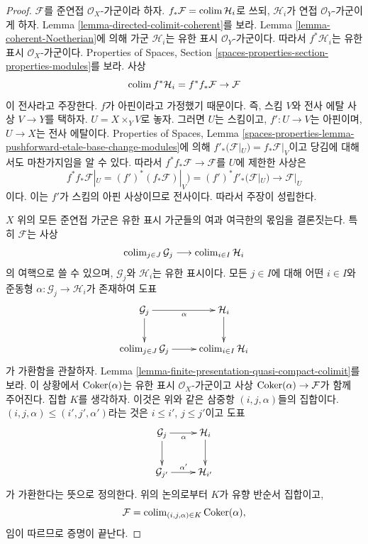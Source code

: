 \begin{proof}
$\mathcal{F}$를 준연접 $\mathcal{O}_X$-가군이라 하자.
$f_*\mathcal{F} = \mathop{\mathrm{colim}}\nolimits \mathcal{H}_i$로 쓰되, $\mathcal{H}_i$가 연접
$\mathcal{O}_Y$-가군이게 하자. Lemma
\ref{lemma-directed-colimit-coherent}를 보라. Lemma
\ref{lemma-coherent-Noetherian}에 의해 가군 $\mathcal{H}_i$는 유한 표시
$\mathcal{O}_Y$-가군이다. 따라서 $f^*\mathcal{H}_i$는 유한 표시
$\mathcal{O}_X$-가군이다. Properties of Spaces, Section
\ref{spaces-properties-section-properties-modules}를 보라. 사상
$$
\mathop{\mathrm{colim}}\nolimits f^*\mathcal{H}_i = f^*f_*\mathcal{F} \to \mathcal{F}
$$
이 전사라고 주장한다. $f$가 아핀이라고 가정했기 때문이다.
즉, 스킴 $V$와 전사 에탈 사상 $V \to Y$를 택하자.
$U = X \times_Y V$로 놓자. 그러면 $U$는 스킴이고,
$f' : U \to V$는 아핀이며, $U \to X$는 전사 에탈이다.
Properties of Spaces, Lemma
\ref{spaces-properties-lemma-pushforward-etale-base-change-modules}에 의해
$f'_*(\mathcal{F}|_U) = f_*\mathcal{F}|_V$이고 당김에 대해서도 마찬가지임을
알 수 있다. 따라서 $f^*f_*\mathcal{F} \to \mathcal{F}$를 $U$에
제한한 사상은
$$
f^*f_*\mathcal{F}|_U = (f')^*(f_*\mathcal{F})|_V) =
(f')^*f'_*(\mathcal{F}|_U) \to \mathcal{F}|_U
$$
이다. 이는 $f'$가 스킴의 아핀 사상이므로 전사이다. 따라서 주장이
성립한다.

\medskip\noindent
$X$ 위의 모든 준연접 가군은 유한 표시 가군들의 여과 여극한의
몫임을 결론짓는다. 특히 $\mathcal{F}$는 사상
$$
\mathop{\mathrm{colim}}\nolimits_{j \in J} \mathcal{G}_j \longrightarrow \mathop{\mathrm{colim}}\nolimits_{i \in I} \mathcal{H}_i
$$
의 여핵으로 쓸 수 있으며, $\mathcal{G}_j$와 $\mathcal{H}_i$는 유한
표시이다. 모든 $j \in I$에 대해 어떤 $i \in I$와 준동형
$\alpha : \mathcal{G}_j \to \mathcal{H}_i$가 존재하여 도표
$$
\xymatrix{
\mathcal{G}_j \ar[r]_\alpha \ar[d] & \mathcal{H}_i \ar[d] \\
\colim_{j \in J} \mathcal{G}_j \ar[r] &
\colim_{i \in I} \mathcal{H}_i
}
$$
가 가환함을 관찰하자. Lemma
\ref{lemma-finite-presentation-quasi-compact-colimit}를 보라.
이 상황에서 $\mathop{\mathrm{Coker}}(\alpha)$는 유한 표시 $\mathcal{O}_X$-가군이고
사상 $\mathop{\mathrm{Coker}}(\alpha) \to \mathcal{F}$가 함께 주어진다. 집합 $K$를
생각하자. 이것은 위와 같은 삼중항 $(i, j, \alpha)$들의 집합이다.
$(i, j, \alpha) \leq (i', j', \alpha')$라는 것은
$i \leq i'$, $j \leq j'$이고 도표
$$
\xymatrix{
\mathcal{G}_j \ar[r]_\alpha \ar[d] & \mathcal{H}_i \ar[d] \\
\mathcal{G}_{j'} \ar[r]^{\alpha'} &
\mathcal{H}_{i'}
}
$$
가 가환한다는 뜻으로 정의한다. 위의 논의로부터 $K$가 유향 반순서
집합이고,
$$
\mathcal{F} = \mathop{\mathrm{colim}}\nolimits_{(i, j, \alpha) \in K} \mathop{\mathrm{Coker}}(\alpha),
$$
임이 따르므로 증명이 끝난다.
\end{proof}






